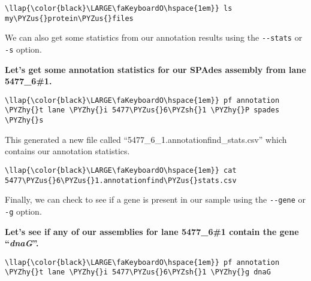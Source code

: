 \documentclass[11pt]{article}
\def\PYZus{\char`\_}
\def\PYZsh{\char`\#}
\def\PYZhy{\char`\-}
\begin{document}
\begin{terminalinput}
\begin{Verbatim}[commandchars=\\\{\}]
\llap{\color{black}\LARGE\faKeyboardO\hspace{1em}} ls my\PYZus{}protein\PYZus{}files
\end{Verbatim}
\end{terminalinput}

    We can also get some statistics from our annotation results using the
\texttt{-\/-stats} or \texttt{-s} option.

\textbf{Let's get some annotation statistics for our SPAdes assembly
from lane 5477\_6\#1.}

\begin{terminalinput}
\begin{Verbatim}[commandchars=\\\{\}]
\llap{\color{black}\LARGE\faKeyboardO\hspace{1em}} pf annotation \PYZhy{}t lane \PYZhy{}i 5477\PYZus{}6\PYZsh{}1 \PYZhy{}P spades \PYZhy{}s
\end{Verbatim}
\end{terminalinput}

    This generated a new file called
``5477\_6\_1.annotationfind\_stats.csv'' which contains our annotation
statistics.

\begin{terminalinput}
\begin{Verbatim}[commandchars=\\\{\}]
\llap{\color{black}\LARGE\faKeyboardO\hspace{1em}} cat 5477\PYZus{}6\PYZus{}1.annotationfind\PYZus{}stats.csv
\end{Verbatim}
\end{terminalinput}

    Finally, we can check to see if a gene is present in our sample using
the \texttt{-\/-gene} or \texttt{-g} option.

\textbf{Let's see if any of our assemblies for lane 5477\_6\#1 contain
the gene ``\textit{dnaG}''.}

\begin{terminalinput}
\begin{Verbatim}[commandchars=\\\{\}]
\llap{\color{black}\LARGE\faKeyboardO\hspace{1em}} pf annotation \PYZhy{}t lane \PYZhy{}i 5477\PYZus{}6\PYZsh{}1 \PYZhy{}g dnaG
\end{Verbatim}
\end{terminalinput}
\end{document}
